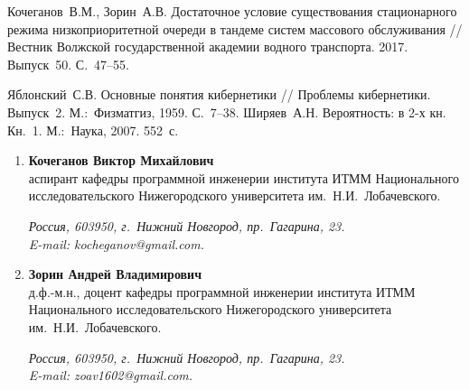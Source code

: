 \documentclass[a4paper,twoside]{article}
\theoremstyle{theorem}
\theoremstyle{remark}
\begin{document}
\begin{thebibliography}{99}
 Кочеганов~В.М., Зорин~А.В. Достаточное условие существования стационарного режима низкоприоритетной очереди в тандеме систем массового обслуживания // Вестник Волжской государственной академии водного транспорта. 2017. Выпуск~50. С.~47–55.

 Яблонский~С.В. Основные понятия кибернетики // Проблемы кибернетики. Выпуск~2. М.:~Физматгиз, 1959. С.~7–38.
 Ширяев~А.Н. Вероятность: в 2-х кн. Кн.~1. М.:~Наука, 2007. 552~с.


\end{thebibliography}

\bigskip{}
\begin{enumerate}[1.]
\item {\bf Кочеганов Виктор Михайлович}\\
аспирант кафедры программной инженерии института ИТММ Национального исследовательского Нижегородского университета им.~Н.И.~Лобачевского.

\vspace{1mm}
{\it Россия, 603950, г.~Нижний Новгород, пр.~Гагарина, 23.\\ E-mail: kocheganov@gmail.com.} 
\item {\bf Зорин Андрей Владимирович}\\
д.ф.-м.н., доцент кафедры программной инженерии института ИТММ Национального исследовательского Нижегородского университета им.~Н.И.~Лобачевского.

\vspace{1mm}
{\it Россия, 603950, г.~Нижний Новгород, пр.~Гагарина, 23.\\ E-mail: zoav1602@gmail.com.} 
\end{enumerate} 
\end{document}
